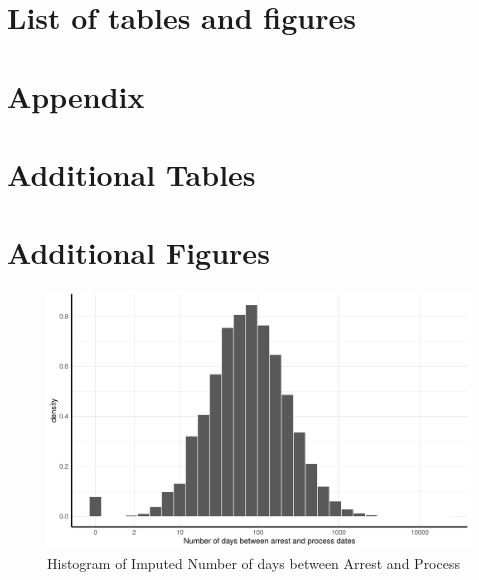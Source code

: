 \newpage
\section*{List of tables and figures}
\listoftables
\listoffigures



\newpage
\section*{Appendix}

\section*{Additional Tables}

\newpage


\newpage


\newpage

\thispagestyle{empty}

\newpage


\newpage


\newpage

\section*{Additional Figures}

\begin{figure}[!h]
\centering
\includegraphics[width=1.2\textwidth]{plots/imputing_arrest_date/mixed_model_preds_hist.pdf}
\caption{Histogram of Imputed Number of days between Arrest and Process}
\label{fig:mixed_model_preds_hist}
\end{figure}


%
